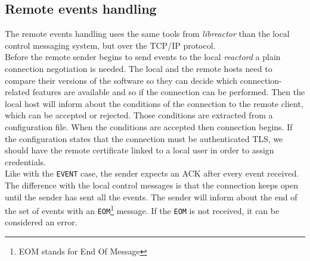 \subsection{Remote events handling}
The remote events handling uses the same tools from \emph{libreactor} than the local control messaging system, but over the TCP/IP 
protocol.\\
Before the remote sender begins to send events to the local \emph{reactord} a plain connection negotiation is needed. The local and the
remote hosts need to compare their versions of the software so they can decide which connection-related features are available and
so if the connection can be performed. Then the local host will inform about the conditions of the connection to the remote client, which 
can be accepted or rejected. Those conditions are extracted from a configuration file. When the conditions are accepted then connection
begins. If the configuration states that the connection must be authenticated TLS, we should have the remote certificate linked to
a local user in order to assign credentials.\\
Like with the \texttt{EVENT} case, the sender expects an ACK after every event received. The difference with the local control messages is
that the connection keeps open until the sender has sent all the events. The sender will inform about the end of the set of events with an
\texttt{EOM}\footnote{EOM stands for End Of Message} message. If the \texttt{EOM} is not received, it can be considered an error.\\
